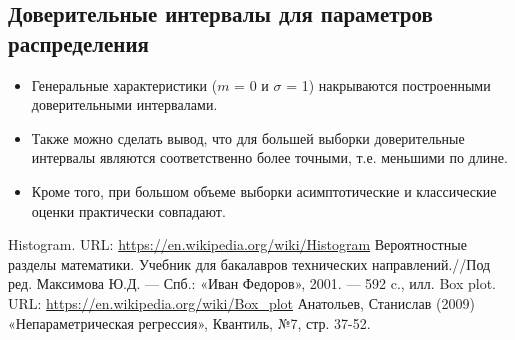 \documentclass[a4paper,14pt]{article}
\begin{document}
	 \subsection{Доверительные интервалы для параметров распределения}
	\begin{itemize}
		\item Генеральные характеристики ($m$ = 0 и $\sigma$ = 1) накрываются построенными доверительными интервалами. 
		\item Также можно сделать вывод, что для большей выборки доверительные интервалы являются соответственно более точными, т.е. меньшими по длине. 
		\item Кроме того, при большом объеме выборки асимптотические и классические оценки практически совпадают.
	\end{itemize}
	

	\newpage
	
	\begin{thebibliography}{4}
		Histogram. URL: \url{https://en.wikipedia.org/wiki/Histogram}
		Вероятностные разделы математики. Учебник для бакалавров технических направлений.//Под ред. Максимова Ю.Д. --- Спб.: «Иван Федоров», 2001. --- 592 c., илл.
		Box plot. URL: \url{https://en.wikipedia.org/wiki/Box_plot}
		Анатольев, Станислав (2009) «Непараметрическая регрессия», Квантиль, №7, стр. 37-52.
	\end{thebibliography}
\end{document}
